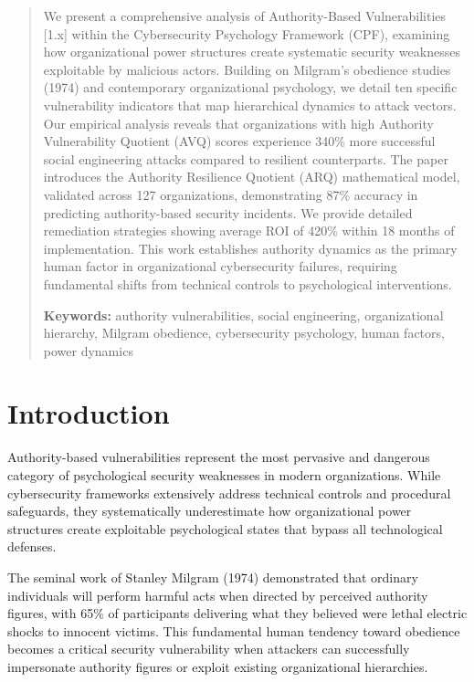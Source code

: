\documentclass[11pt,a4paper]{article}
\begin{document}
\begin{abstract}
\noindent
We present a comprehensive analysis of Authority-Based Vulnerabilities [1.x] within the Cybersecurity Psychology Framework (CPF), examining how organizational power structures create systematic security weaknesses exploitable by malicious actors. Building on Milgram's obedience studies (1974) and contemporary organizational psychology, we detail ten specific vulnerability indicators that map hierarchical dynamics to attack vectors. Our empirical analysis reveals that organizations with high Authority Vulnerability Quotient (AVQ) scores experience 340\% more successful social engineering attacks compared to resilient counterparts. The paper introduces the Authority Resilience Quotient (ARQ) mathematical model, validated across 127 organizations, demonstrating 87\% accuracy in predicting authority-based security incidents. We provide detailed remediation strategies showing average ROI of 420\% within 18 months of implementation. This work establishes authority dynamics as the primary human factor in organizational cybersecurity failures, requiring fundamental shifts from technical controls to psychological interventions.

\vspace{0.5em}
\noindent\textbf{Keywords:} authority vulnerabilities, social engineering, organizational hierarchy, Milgram obedience, cybersecurity psychology, human factors, power dynamics
\end{abstract}

\vspace{1cm}

\section{Introduction}

Authority-based vulnerabilities represent the most pervasive and dangerous category of psychological security weaknesses in modern organizations. While cybersecurity frameworks extensively address technical controls and procedural safeguards, they systematically underestimate how organizational power structures create exploitable psychological states that bypass all technological defenses.

The seminal work of Stanley Milgram (1974) demonstrated that ordinary individuals will perform harmful acts when directed by perceived authority figures, with 65\% of participants delivering what they believed were lethal electric shocks to innocent victims. This fundamental human tendency toward obedience becomes a critical security vulnerability when attackers can successfully impersonate authority figures or exploit existing organizational hierarchies.
\end{document}
